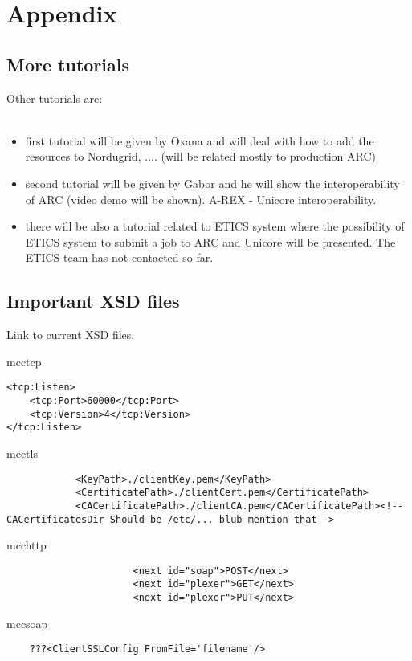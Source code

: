 \chapter{Appendix}

\section{More tutorials}

Other tutorials are:\\
\\
\begin{itemize}
 \item first tutorial will be given by Oxana and will deal with how to add the 
resources to Nordugrid, .... (will be related mostly to production ARC)
 \item second tutorial will be given by Gabor and he will show the 
interoperability of ARC (video demo will be shown). A-REX - Unicore 
interoperability.
 \item there will be also a tutorial related to ETICS system where the 
possibility of ETICS system to submit a job to ARC and Unicore will be 
presented. The ETICS team has not contacted so far.
\end{itemize}


\section{Important XSD files}


Link to current XSD files.

    mcctcp\\
\begin{verbatim}
<tcp:Listen>
	<tcp:Port>60000</tcp:Port>
	<tcp:Version>4</tcp:Version>
</tcp:Listen>
\end{verbatim}
    mcctls\\
\begin{verbatim}
 			<KeyPath>./clientKey.pem</KeyPath>
			<CertificatePath>./clientCert.pem</CertificatePath>
			<CACertificatePath>./clientCA.pem</CACertificatePath><!-- CACertificatesDir Should be /etc/... blub mention that-->

\end{verbatim}

    mcchttp\\
\begin{verbatim}
                      <next id="soap">POST</next>
                      <next id="plexer">GET</next>
                      <next id="plexer">PUT</next>
\end{verbatim}
    mccsoap\\
\begin{verbatim}
	???<ClientSSLConfig FromFile='filename'/>  
\end{verbatim}


